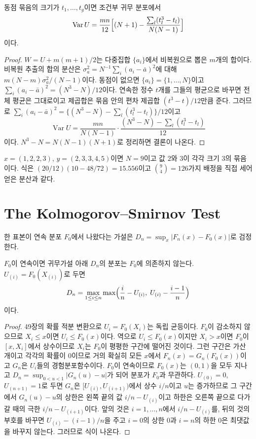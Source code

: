 \begin{proposition}
\label{prop:ties-variance}
동점 묶음의 크기가 $t_1,\dots,t_g$이면 조건부 귀무 분포에서
\[
\operatorname{Var}U=\frac{mn}{12}\Bigl[(N+1)-\frac{\sum_l(t_l^3-t_l)}{N(N-1)}\Bigr]
\]
이다.
\end{proposition}

\begin{proof}
$W=U+m(m+1)/2$는 다중집합 $\{a_i\}$에서 비복원으로 뽑은 $m$개의 합이다. 비복원 추출의 합의 분산은 $\sigma_a^2=N^{-1}\sum_i(a_i-\bar a)^2$에 대해 $m(N-m)\sigma_a^2/(N-1)$이다. 동점이 없으면 $\{a_i\}=\{1,\dots,N\}$이고 $\sum_i(a_i-\bar a)^2=(N^3-N)/12$이다. 연속한 정수 $t$개를 그들의 평균으로 바꾸면 전체 평균은 그대로이고 제곱합은 묶음 안의 편차 제곱합 $(t^3-t)/12$만큼 준다. 그러므로 $\sum_i(a_i-\bar a)^2=\{(N^3-N)-\sum_l(t_l^3-t_l)\}/12$이고
\[
\operatorname{Var}U=\frac{mn}{N(N-1)}\cdot\frac{(N^3-N)-\sum_l(t_l^3-t_l)}{12}
\]
이다. $N^3-N=N(N-1)(N+1)$로 정리하면 결론이 나온다.
\end{proof}

$x=(1,2,2,3)$, $y=(2,3,3,4,5)$이면 $N=9$이고 값 $2$와 $3$이 각각 크기 $3$의 묶음이다. 식은 $(20/12)(10-48/72)=15.556$이고 $\binom94=126$가지 배정을 직접 세어 얻은 분산과 같다.

\section{The Kolmogorov--Smirnov Test}
\label{sec:ks}

한 표본이 연속 분포 $F_0$에서 나왔다는 가설은 $D_n=\sup_x|F_n(x)-F_0(x)|$로 검정한다\cite{kolmogorov1933ks}.

\begin{proposition}
\label{prop:ks-free}
$F_0$이 연속이면 귀무가설 아래 $D_n$의 분포는 $F_0$에 의존하지 않는다. $U_{(i)}=F_0(X_{(i)})$로 두면
\[
D_n=\max_{1\le i\le n}\max\Bigl(\frac in-U_{(i)},\;U_{(i)}-\frac{i-1}n\Bigr)
\]
이다.
\end{proposition}

\begin{proof}
49장의 확률 적분 변환으로 $U_i=F_0(X_i)$는 독립 균등이다. $F_0$이 감소하지 않으므로 $X_i\le x$이면 $U_i\le F_0(x)$이다. 역으로 $U_i\le F_0(x)$이지만 $X_i>x$이면 $F_0$이 $[x,X_i]$에서 상수이므로 $X_i$는 $F_0$이 평평한 구간에 떨어진 것이다. 그런 구간은 가산 개이고 각각의 확률이 $0$이므로 거의 확실히 모든 $x$에서 $F_n(x)=G_n(F_0(x))$이고 $G_n$은 $U_i$들의 경험분포함수이다. $F_0$이 연속이므로 $F_0(x)$는 $(0,1)$을 모두 지나고 $D_n=\sup_{0<u<1}|G_n(u)-u|$가 되어 분포가 $F_0$과 무관하다. $U_{(0)}=0$, $U_{(n+1)}=1$로 두면 $G_n$은 $[U_{(i)},U_{(i+1)})$에서 상수 $i/n$이고 $u$는 증가하므로 그 구간에서 $G_n(u)-u$의 상한은 왼쪽 끝의 값 $i/n-U_{(i)}$이고 하한은 오른쪽 끝으로 다가갈 때의 극한 $i/n-U_{(i+1)}$이다. 앞의 것은 $i=1,\dots,n$에서 $i/n-U_{(i)}$를, 뒤의 것의 부호를 바꾸면 $U_{(i)}-(i-1)/n$을 주고 $i=0$의 상한 $0$과 $i=n$의 하한 $0$은 최댓값을 바꾸지 않는다. 그러므로 식이 나온다.
\end{proof}

